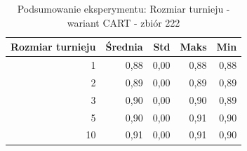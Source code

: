 \begin{table}[htbp]
\centering
\small
\setlength{\tabcolsep}{6pt}
\renewcommand{\arraystretch}{1.2}
\caption{Podsumowanie eksperymentu: Rozmiar turnieju - wariant CART - zbiór 222}
\label{tab:CART_tournament_size_222}
\begin{tabular}{r|r|r|r|r}
\toprule
Rozmiar turnieju & Średnia & Std & Maks & Min \\
\hline
1 & 0,88 & 0,00 & 0,88 & 0,88 \\
2 & 0,89 & 0,00 & 0,89 & 0,89 \\
3 & 0,90 & 0,00 & 0,90 & 0,89 \\
5 & 0,90 & 0,00 & 0,91 & 0,90 \\
10 & 0,91 & 0,00 & 0,91 & 0,90 \\
\bottomrule
\end{tabular}
\end{table}
